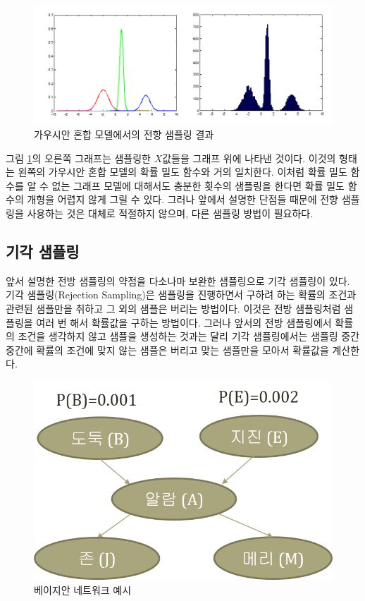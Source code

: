 \documentclass[a4paper]{oblivoir}
\begin{document}
\begin{figure}[ht] \centering 
\includegraphics[scale=0.45]{fig10_3.png} 
\caption{가우시안 혼합 모델에서의 전향 샘플링 결과}
\label{fig:10-3}
\end{figure}  

그림 \ref{fig:10-3}의 오른쪽 그래프는 샘플링한 $X$값들을 그래프 위에 나타낸 것이다. 이것의 형태는 왼쪽의 가우시안 혼합 모델의 확률 밀도  함수와 거의 일치한다. 이처럼 확률 밀도 함수를 알 수 없는 그래프 모델에 대해서도 충분한 횟수의 샘플링을 한다면 확률 밀도 함수의 개형을 어렵지 않게 그릴 수 있다. 그러나 앞에서 설명한 단점들 때문에 전향 샘플링을 사용하는 것은 대체로 적절하지 않으며, 다른 샘플링 방법이 필요하다. 

\subsection{기각 샘플링}

앞서 설명한 전방 샘플링의 약점을 다소나마 보완한 샘플링으로 기각 샘플링이 있다. 기각 샘플링(Rejection Sampling)은 샘플링을 진행하면서 구하려 하는 확률의 조건과 관련된 샘플만을 취하고 그 외의 샘플은 버리는 방법이다. 이것은 전방 샘플링처럼 샘플링을 여러 번 해서 확률값을 구하는 방법이다. 그러나 앞서의 전방 샘플링에서 확률의 조건을 생각하지 않고 샘플을 생성하는 것과는 달리 기각 샘플링에서는 샘플링 중간중간에 확률의 조건에 맞지 않는 샘플은 버리고 맞는 샘플만을 모아서 확률값을 계산한다. \\

\begin{figure}[ht] \centering 
\includegraphics[scale=0.6]{fig10_1.png} 
\caption{베이지안 네트워크 예시}
\label{fig:10-1-2}
\end{figure} 
\end{document}
